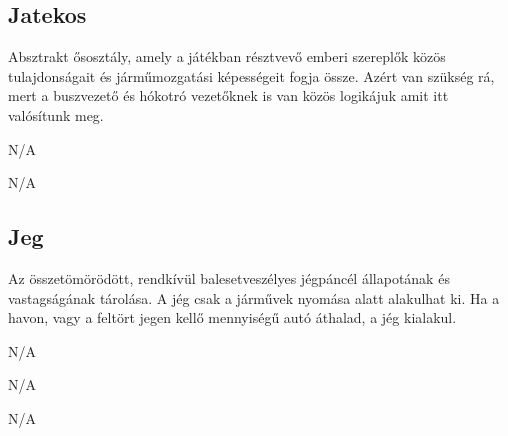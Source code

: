 \subsection{Jatekos}
\begin{class-template-responsibility}
   Absztrakt ősosztály, amely a játékban résztvevő emberi szereplők közös tulajdonságait és járműmozgatási képességeit fogja össze. Azért van szükség rá, mert a buszvezető és hókotró vezetőknek is van közös logikájuk amit itt valósítunk meg.
\end{class-template-responsibility}
\begin{class-template-baseclass}
    N/A
\end{class-template-baseclass}
\begin{class-template-interface}
    N/A
\end{class-template-interface}
\begin{class-template-attribute}
\end{class-template-attribute}
\begin{class-template-method}
\end{class-template-method}

\subsection{Jeg}
\begin{class-template-responsibility}
    Az összetömörödött, rendkívül balesetveszélyes jégpáncél állapotának és vastagságának tárolása. A jég csak a járművek nyomása alatt alakulhat ki. Ha a havon, vagy a feltört jegen kellő mennyiségű autó áthalad, a jég kialakul.
\end{class-template-responsibility}
\begin{class-template-baseclass}
    N/A
\end{class-template-baseclass}
\begin{class-template-interface}
    N/A
\end{class-template-interface}
\begin{class-template-attribute}
\end{class-template-attribute}
\begin{class-template-method}
    N/A
\end{class-template-method}

